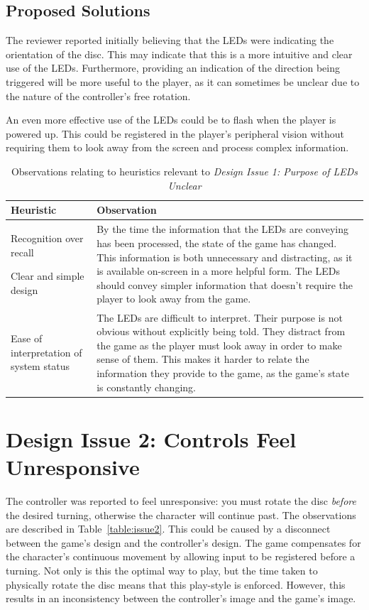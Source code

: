 \documentclass{scrartcl}
\begin{document}
\subsection{Proposed Solutions}
The reviewer reported initially believing that the LEDs were indicating the orientation of the disc. This may indicate that this is a more intuitive and clear use of the LEDs. Furthermore, providing an indication of the direction being triggered will be more useful to the player, as it can sometimes be unclear due to the nature of the controller's free rotation. 

An even more effective use of the LEDs could be to flash when the player is powered up. This could be registered in the player's peripheral vision without requiring them to look away from the screen and process complex information.

\begin{table}[h]
\centering
\begin{tabular}{|m{5cm}|m{6cm}|}
\hline
\textbf{Heuristic} & \textbf{Observation} \\ \hline
Recognition over recall \par Clear and simple design & 
By the time the information that the LEDs are conveying has been processed, the state of the game has changed. This information is both unnecessary and distracting, as it is available on-screen in a more helpful form. The LEDs should convey simpler information that doesn't require the player to look away from the game. \\ \hline
Ease of interpretation of system status & 
The LEDs are difficult to interpret. Their purpose is not obvious without explicitly being told. They distract from the game as the player must look away in order to make sense of them. This makes it harder to relate the information they provide to the game, as the game's state is constantly changing. \\ \hline
\end{tabular}
\caption{Observations relating to heuristics relevant to \textit{Design Issue 1: Purpose of LEDs Unclear}}
\label{table:issue1}
\end{table}

\section{Design Issue 2: Controls Feel Unresponsive}
The controller was reported to feel unresponsive: you must rotate the disc \textit{before} the desired turning, otherwise the character will continue past. The observations are described in Table~\ref{table:issue2}. This could be caused by a disconnect between the game's design and the controller's design. The game compensates for the character's continuous movement by allowing input to be registered before a turning. Not only is this the optimal way to play, but the time taken to physically rotate the disc means that this play-style is enforced. However, this results in an inconsistency between the controller's image and the game's image.
\end{document}
